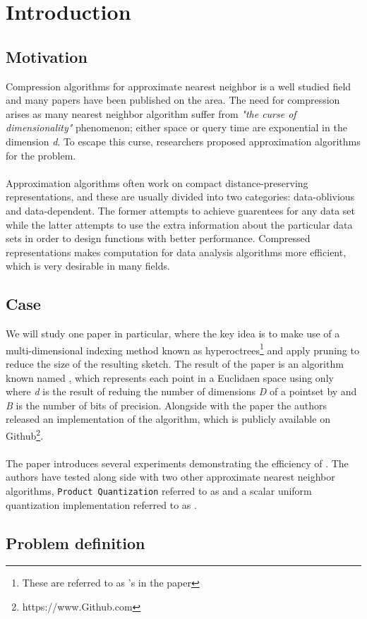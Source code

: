 \section{Introduction}
\label{introduction}
\subsection{Motivation} %
Compression algorithms for approximate nearest neighbor is a well studied field and many papers have been published on the area. The need for compression arises as many nearest neighbor algorithm suffer from \textit{"the curse of dimensionality"} phenomenon; either space or query time are exponential in the dimension \textit{d}. To escape this curse,
researchers proposed approximation algorithms for the problem.\cite{ilya15} 
\\
\\
Approximation algorithms often work on compact distance-preserving representations, and these are usually divided into two categories: data-oblivious and data-dependent. The former attempts to achieve guarentees for any data set while the latter attempts to use the extra information about the particular data sets in order to design functions with better performance. Compressed representations makes computation for data analysis algorithms more efficient, which is very desirable in many fields.
\subsection{Case} %
We will study one paper in particular, where the key idea is to make use of a multi-dimensional indexing method known as hyperoctrees\footnote{These are referred to as \qt{}'s in the paper} and apply pruning to reduce the size of the resulting sketch. The result of the paper is an algorithm known named \qs{}, which represents each point in a Euclidaen space using only  where \textit{d} is the result of reduing the number of dimensions \textit{D} of a pointset by  and \textit{B} is the number of bits of precision. Alongside with the paper the authors released an implementation of the algorithm, which is publicly available on Github\footnote{https://www.Github.com}. 
\\
\\
The paper introduces several experiments demonstrating the efficiency of \qs{}. The authors have tested \qs{} along side with two other approximate nearest neighbor algorithms, \texttt{Product Quantization} referred to as \pq{} and a scalar uniform quantization implementation referred to as \gr{}.
\subsection{Problem definition} %
